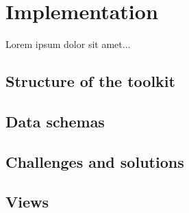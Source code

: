 \chapter{Implementation}

\begin{chapterabstract}
Lorem ipsum dolor sit amet...
\end{chapterabstract}

\section{Structure of the toolkit}

\section{Data schemas}

\section{Challenges and solutions}

\section{Views}